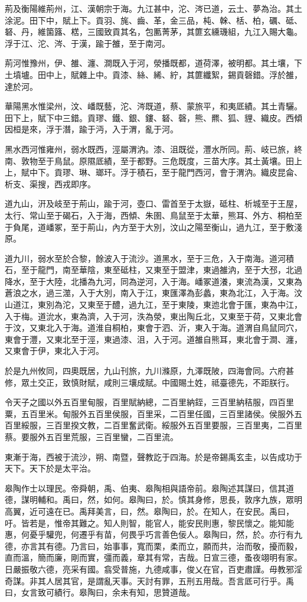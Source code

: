 荊及衡陽維荊州，江、漢朝宗于海。九江甚中，沱、涔已道，云土、夢為治。其土涂泥。田下中，賦上下。貢羽、旄、齒、革，金三品，杶、榦、栝、柏，礪、砥、砮、丹，維箘簬、楛，三國致貢其名，包匭菁茅，其篚玄纁璣組，九江入賜大龜。浮于江、沱、涔、于漢，踰于雒，至于南河。

荊河惟豫州，伊、雒、瀍、澗既入于河，滎播既都，道荷澤，被明都。其土壤，下土墳壚。田中上，賦雜上中。貢漆、絲、絺、紵，其篚纖絮，錫貢磬錯。浮於雒，達於河。

華陽黑水惟梁州，汶、嶓既藝，沱、涔既道，蔡、蒙旅平，和夷厎績。其土青驪。田下上，賦下中三錯。貢璆、鐵、銀、鏤、砮、磬，熊、羆、狐、貍、織皮。西傾因桓是來，浮于潛，踰于沔，入于渭，亂于河。

黑水西河惟雍州，弱水既西，涇屬渭汭。漆、沮既從，灃水所同。荊、岐已旅，終南、敦物至于鳥鼠。原隰厎績，至于都野。三危既度，三苗大序。其土黃壤。田上上，賦中下。貢璆、琳、瑯玕。浮于積石，至于龍門西河，會于渭汭。織皮昆侖、析支、渠搜，西戎即序。

道九山，汧及岐至于荊山，踰于河，壺口、雷首至于太嶽，砥柱、析城至于王屋，太行、常山至于碣石，入于海，西傾、朱圉、鳥鼠至于太華，熊耳、外方、桐柏至于負尾，道嶓冢，至于荊山，內方至于大別，汶山之陽至衡山，過九江，至于敷淺原。

道九川，弱水至於合黎，餘波入于流沙。道黑水，至于三危，入于南海。道河積石，至于龍門，南至華陰，東至砥柱，又東至于盟津，東過雒汭，至于大邳，北過降水，至于大陸，北播為九河，同為逆河，入于海。嶓冢道瀁，東流為漢，又東為蒼浪之水，過三澨，入于大別，南入于江，東匯澤為彭蠡，東為北江，入于海。汶山道江，東別為沱，又東至于醴，過九江，至于東陵，東迆北會于匯，東為中江，入于梅。道沇水，東為濟，入于河，泆為滎，東出陶丘北，又東至于荷，又東北會于汶，又東北入于海。道淮自桐柏，東會于泗、沂，東入于海。道渭自鳥鼠同穴，東會于灃，又東北至于涇，東過漆、沮，入于河。道雒自熊耳，東北會于澗、瀍，又東會于伊，東北入于河。

於是九州攸同，四奧既居，九山刊旅，九川滌原，九澤既陂，四海會同。六府甚修，眾土交正，致慎財賦，咸則三壤成賦。中國賜土姓，祗臺德先，不距朕行。

令天子之國以外五百里甸服，百里賦納總，二百里納銍，三百里納秸服，四百里粟，五百里米。甸服外五百里侯服，百里采，二百里任國，三百里諸侯。侯服外五百里綏服，三百里揆文教，二百里奮武衛。綏服外五百里要服，三百里夷，二百里蔡。要服外五百里荒服，三百里蠻，二百里流。

東漸于海，西被于流沙，朔、南暨，聲教訖于四海。於是帝錫禹玄圭，以告成功于天下。天下於是太平治。

皋陶作士以理民。帝舜朝，禹、伯夷、皋陶相與語帝前。皋陶述其謀曰，信其道德，謀明輔和。禹曰，然，如何。皋陶曰，於。慎其身修，思長，敦序九族，眾明高翼，近可遠在已。禹拜美言，曰，然。皋陶曰，於。在知人，在安民。禹曰，吁。皆若是，惟帝其難之。知人則智，能官人，能安民則惠，黎民懷之。能知能惠，何憂乎驩兜，何遷乎有苗，何畏乎巧言善色佞人。皋陶曰，然，於。亦行有九德，亦言其有德。乃言曰，始事事，寬而栗，柔而立，願而共，治而敬，擾而毅，直而溫，簡而廉，剛而實，彊而義，章其有常，吉哉。日宣三德，蚤夜翊明有家。日嚴振敬六德，亮采有國。翕受普施，九德咸事，俊乂在官，百吏肅謹。毋教邪淫奇謀。非其人居其官，是謂亂天事。天討有罪，五刑五用哉。吾言厎可行乎。禹曰，女言致可績行。皋陶曰，余未有知，思贊道哉。

